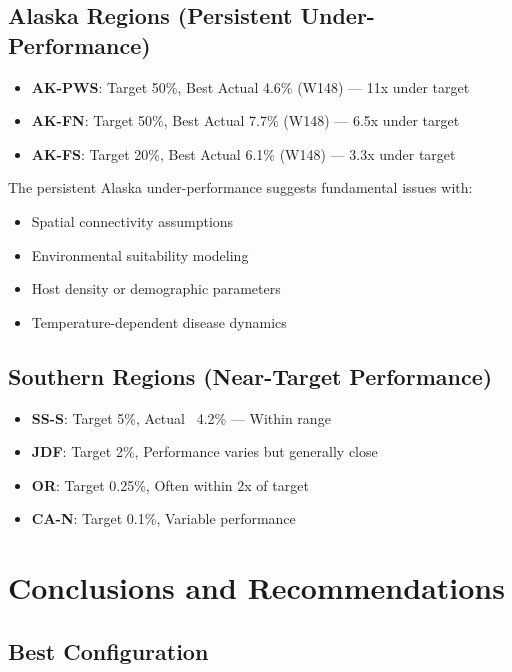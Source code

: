 \documentclass[11pt]{article}
\begin{document}
\subsection{Alaska Regions (Persistent Under-Performance)}

\begin{itemize}
\item \textbf{AK-PWS}: Target 50\%, Best Actual 4.6\% (W148) --- 11x under target
\item \textbf{AK-FN}: Target 50\%, Best Actual 7.7\% (W148) --- 6.5x under target  
\item \textbf{AK-FS}: Target 20\%, Best Actual 6.1\% (W148) --- 3.3x under target
\end{itemize}

The persistent Alaska under-performance suggests fundamental issues with:
\begin{itemize}
\item Spatial connectivity assumptions
\item Environmental suitability modeling  
\item Host density or demographic parameters
\item Temperature-dependent disease dynamics
\end{itemize}

\subsection{Southern Regions (Near-Target Performance)}

\begin{itemize}
\item \textbf{SS-S}: Target 5\%, Actual ~4.2\% --- Within range
\item \textbf{JDF}: Target 2\%, Performance varies but generally close
\item \textbf{OR}: Target 0.25\%, Often within 2x of target
\item \textbf{CA-N}: Target 0.1\%, Variable performance
\end{itemize}

\section{Conclusions and Recommendations}

\subsection{Best Configuration}
\end{document}
